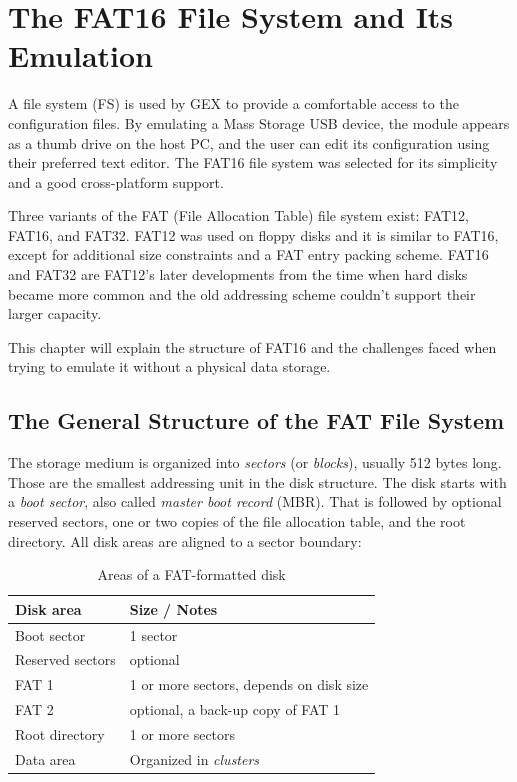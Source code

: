 \chapter{The FAT16 File System and Its Emulation} \label{sec:fat16}

A file system (FS) is used by GEX to provide a comfortable access to the configuration files. By emulating a Mass Storage USB device, the module appears as a thumb drive on the host PC, and the user can edit its configuration using their preferred text editor. The FAT16 file system was selected for its simplicity and a good cross-platform support.

Three variants of the FAT (File Allocation Table) file system exist: FAT12, FAT16, and FAT32. FAT12 was used on floppy disks and it is similar to FAT16, except for additional size constraints and a FAT entry packing scheme. FAT16 and FAT32 are FAT12's later developments from the time when hard disks became more common and the old addressing scheme couldn't support their larger capacity.

This chapter will explain the structure of FAT16 and the challenges faced when trying to emulate it without a physical data storage.

\section{The General Structure of the FAT File System}

The storage medium is organized into \textit{sectors} (or \textit{blocks}), usually 512 bytes long. Those are the smallest addressing unit in the disk structure. The disk starts with a \textit{boot sector}, also called \textit{master boot record} (MBR). That is followed by optional reserved sectors, one or two copies of the file allocation table, and the root directory. All disk areas are aligned to a sector boundary:

\begin{table}[h]
	\centering
	\begin{tabular}{ll}
		\toprule
		\textbf{Disk area} & \textbf{Size / Notes} \\
		\midrule
		Boot sector & 1 sector \\
		Reserved sectors & optional \\ 
		FAT 1 & 1 or more sectors, depends on disk size \\ 
		FAT 2 & optional, a back-up copy of FAT 1 \\ 
		Root directory & 1 or more sectors \\ 
		Data area & Organized in \textit{clusters} \\ 
		\bottomrule
	\end{tabular}
	\caption{\label{tab:fat16-disk-areas}Areas of a FAT-formatted disk}
\end{table}

